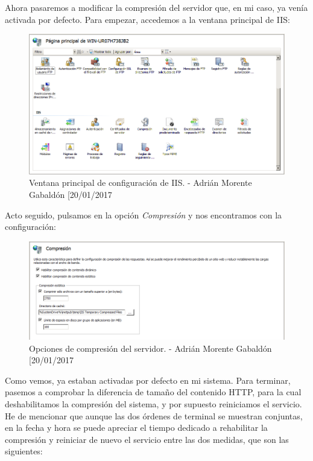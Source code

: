 Ahora pasaremos a modificar la compresión del servidor que, en mi caso, ya venía activada por defecto. Para empezar, accedemos a la ventana principal de IIS:
\begin{figure}[H]
	\centering
	\includegraphics[scale=0.5]{iis-primero}
	\caption{Ventana principal de configuración de IIS. - Adrián Morente Gabaldón [20/01/2017}
	\label{figura16}
\end{figure}
Acto seguido, pulsamos en la opción \emph{Compresión} y nos encontramos con la configuración:
\begin{figure}[H]
	\centering
	\includegraphics[scale=0.5]{iis-segundo}
	\caption{Opciones de compresión del servidor. - Adrián Morente Gabaldón [20/01/2017}
	\label{figura17}
\end{figure}
Como vemos, ya estaban activadas por defecto en mi sistema. Para terminar, pasemos a comprobar la diferencia de tamaño del contenido HTTP, para la cual deshabilitamos la compresión del sistema, y por supuesto reiniciamos el servicio. He de mencionar que aunque las dos órdenes de terminal se muestran conjuntas, en la fecha y hora se puede apreciar el tiempo dedicado a rehabilitar la compresión y reiniciar de nuevo el servicio entre las dos medidas, que son las siguientes:
